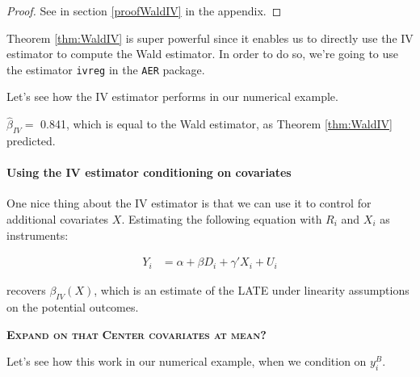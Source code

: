 \documentclass[]{book}
\newenvironment{Shaded}{\begin{snugshade}}{\end{snugshade}}
\newcommand{\KeywordTok}[1]{\textcolor[rgb]{0.13,0.29,0.53}{\textbf{#1}}}
\newcommand{\DecValTok}[1]{\textcolor[rgb]{0.00,0.00,0.81}{#1}}
\newcommand{\StringTok}[1]{\textcolor[rgb]{0.31,0.60,0.02}{#1}}
\newcommand{\OperatorTok}[1]{\textcolor[rgb]{0.81,0.36,0.00}{\textbf{#1}}}
\newcommand{\NormalTok}[1]{#1}
\let\oldparagraph\paragraph
\renewcommand{\paragraph}[1]{\oldparagraph{#1}\mbox{}}
\theoremstyle{definition}
\theoremstyle{definition}
\theoremstyle{definition}
\theoremstyle{remark}
\let\BeginKnitrBlock\begin \let\EndKnitrBlock\end
\begin{document}
\BeginKnitrBlock{proof}
\iffalse{} {Proof. } \fi{}See in section \ref{proofWaldIV} in the
appendix.
\EndKnitrBlock{proof}

Theorem \ref{thm:WaldIV} is super powerful since it enables us to
directly use the IV estimator to compute the Wald estimator. In order to
do so, we're going to use the estimator \texttt{ivreg} in the
\texttt{AER} package.

\BeginKnitrBlock{example}
\protect\hypertarget{exm:unnamed-chunk-124}{}{\label{exm:unnamed-chunk-124}
}Let's see how the IV estimator performs in our numerical example.
\EndKnitrBlock{example}

\begin{Shaded}
\end{Shaded}

\(\hat{\beta}_{IV}=\) 0.841, which is equal to the Wald estimator, as
Theorem \ref{thm:WaldIV} predicted.

\paragraph{Using the IV estimator conditioning on
covariates}\label{using-the-iv-estimator-conditioning-on-covariates}

One nice thing about the IV estimator is that we can use it to control
for additional covariates \(X\). Estimating the following equation with
\(R_i\) and \(X_i\) as instruments:

\begin{align*}
    Y_i &  = \alpha +  \beta D_i + \gamma' X_i + U_i
  \end{align*}

recovers \(\beta_{IV}(X)\), which is an estimate of the LATE under
linearity assumptions on the potential outcomes.

\textbf{\textsc{Expand on that}} \textbf{\textsc{Center covariates at
mean?}}

\BeginKnitrBlock{example}
\protect\hypertarget{exm:unnamed-chunk-125}{}{\label{exm:unnamed-chunk-125}
}Let's see how this work in our numerical example, when we condition on
\(y^B_i\).
\EndKnitrBlock{example}
\end{document}
